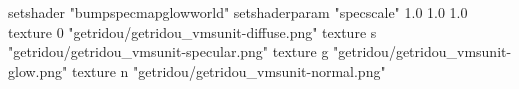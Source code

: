 setshader "bumpspecmapglowworld"
setshaderparam "specscale" 1.0 1.0 1.0
texture 0 "getridou/getridou_vmsunit-diffuse.png"
texture s "getridou/getridou_vmsunit-specular.png"
texture g "getridou/getridou_vmsunit-glow.png"
texture n "getridou/getridou_vmsunit-normal.png"
